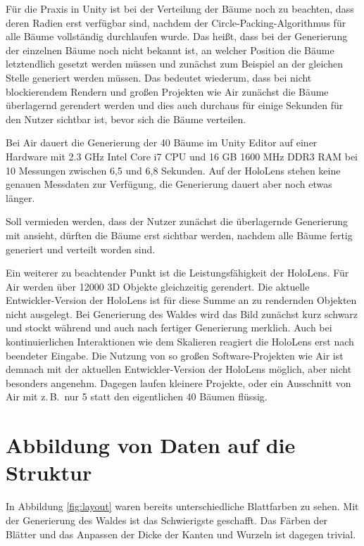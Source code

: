 Für die Praxis in Unity ist bei der Verteilung der Bäume noch zu beachten, dass deren Radien erst verfügbar sind, nachdem der Circle-Packing-Algorithmus für alle Bäume vollständig durchlaufen wurde. Das heißt, dass bei der Generierung der einzelnen Bäume noch nicht bekannt ist, an welcher Position die Bäume letztendlich gesetzt werden müssen und zunächst zum Beispiel an der gleichen Stelle generiert werden müssen. Das bedeutet wiederum, dass bei nicht blockierendem Rendern und großen Projekten wie Air zunächst die Bäume überlagernd gerendert werden und dies auch durchaus für einige Sekunden für den Nutzer sichtbar ist, bevor sich die Bäume verteilen.

Bei Air dauert die Generierung der 40 Bäume im Unity Editor auf einer Hardware mit 2.3 GHz Intel Core i7 CPU und 16 GB 1600 MHz DDR3 RAM bei 10 Messungen zwischen 6,5 und 6,8 Sekunden. Auf der HoloLens stehen keine genauen Messdaten zur Verfügung, die Generierung dauert aber noch etwas länger.

Soll vermieden werden, dass der Nutzer zunächst die überlagernde Generierung mit ansieht, dürften die Bäume erst sichtbar werden, nachdem alle Bäume fertig generiert und verteilt worden sind.

Ein weiterer zu beachtender Punkt ist die Leistungsfähigkeit der HoloLens. Für Air werden über 12000 3D Objekte gleichzeitig gerendert. Die aktuelle Entwickler-Version der HoloLens ist für diese Summe an zu rendernden Objekten nicht ausgelegt. Bei Generierung des Waldes wird das Bild zunächst kurz schwarz und stockt während und auch nach fertiger Generierung merklich. Auch bei kontinuierlichen Interaktionen wie dem Skalieren reagiert die HoloLens erst nach beendeter Eingabe. Die Nutzung von so großen Software-Projekten wie Air ist demnach mit der aktuellen Entwickler-Version der HoloLens möglich, aber nicht besonders angenehm. Dagegen laufen kleinere Projekte, oder ein Ausschnitt von Air mit z.\,B.\ nur 5 statt den eigentlichen 40 Bäumen flüssig.

\section{Abbildung von Daten auf die Struktur}
\label{sec:data}

In Abbildung \ref{fig:layout} waren bereits unterschiedliche Blattfarben zu sehen. Mit der Generierung des Waldes ist das Schwierigste geschafft. Das Färben der Blätter und das Anpassen der Dicke der Kanten und Wurzeln ist dagegen trivial.

